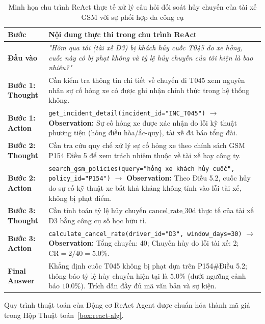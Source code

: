 \documentclass[a4paper,11pt]{article}
\begin{document}
\begin{table}[htbp]
\centering
\footnotesize
\caption{Minh họa chu trình ReAct thực tế xử lý câu hỏi đối soát hủy chuyến của tài xế GSM với sự phối hợp đa công cụ}
\label{tab:react-trace-example}
\vspace{0.15cm}
\begin{tabularx}{\textwidth}{l>{\raggedright\arraybackslash}X}
\toprule
\textbf{Bước} & \textbf{Nội dung thực thi trong chu trình ReAct} \\
\midrule
\textbf{Đầu vào} & \textit{"Hôm qua tôi (tài xế D3) bị khách hủy cuốc T045 do xe hỏng, cuốc này có bị phạt không và tỷ lệ hủy chuyến của tôi hiện là bao nhiêu?"} \\
\textbf{Bước 1: Thought} & Cần kiểm tra thông tin chi tiết về chuyến đi T045 xem nguyên nhân sự cố hỏng xe có được ghi nhận chính thức trong hệ thống không. \\
\textbf{Bước 1: Action} & \texttt{get\_incident\_detail(incident\_id="INC\_T045")} $\to$ \textbf{Observation:} Sự cố hỏng xe được xác nhận do lỗi kỹ thuật phương tiện (hỏng điều hòa/ắc-quy), tài xế đã báo tổng đài. \\
\textbf{Bước 2: Thought} & Cần tra cứu quy chế xử lý sự cố hỏng xe theo chính sách GSM P154 Điều 5 để xem trách nhiệm thuộc về tài xế hay công ty. \\
\textbf{Bước 2: Action} & \texttt{search\_gsm\_policies(query="hỏng xe khách hủy cuốc", policy\_id="P154")} $\to$ \textbf{Observation:} Theo Điều 5.2, cuốc hủy do sự cố kỹ thuật xe bất khả kháng không tính vào lỗi tài xế, không bị phạt điểm. \\
\textbf{Bước 3: Thought} & Cần tính toán tỷ lệ hủy chuyến $\text{cancel\_rate\_30d}$ thực tế của tài xế D3 bằng công cụ số học hữu tỉ. \\
\textbf{Bước 3: Action} & \texttt{calculate\_cancel\_rate(driver\_id="D3", window\_days=30)} $\to$ \textbf{Observation:} Tổng chuyến: 40; Chuyến hủy do lỗi tài xế: 2; $\text{CR} = 2/40 = 5.0\%$. \\
\textbf{Final Answer} & Khẳng định cuốc T045 không bị phạt dựa trên P154\#Điều 5.2; thông báo tỷ lệ hủy chuyến hiện tại là $5.0\%$ (dưới ngưỡng cảnh báo $10.0\%$). Trích dẫn đầy đủ mã văn bản và sự kiện. \\
\bottomrule
\end{tabularx}
\end{table}

Quy trình thuật toán của Động cơ ReAct Agent được chuẩn hóa thành mã giả trong Hộp Thuật toán~\ref{box:react-alg}.
\end{document}
